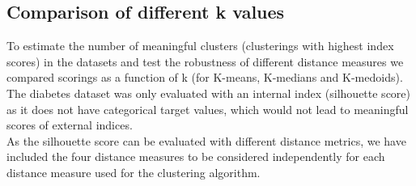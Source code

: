 

\subsection{Comparison of different k values}
To estimate the number of meaningful clusters (clusterings with highest index scores) in the datasets and test the robustness of different distance measures we compared scorings as a function of k (for K-means, K-medians and K-medoids). The diabetes dataset was only evaluated with an internal index (silhouette score) as it does not have categorical target values, which would not lead to meaningful scores of external indices.  \\
As the silhouette score can be evaluated with different distance metrics, we have included the four distance measures to be considered independently for each distance measure used for the clustering algorithm. 

